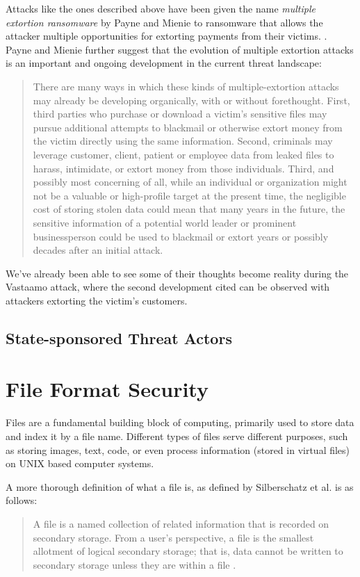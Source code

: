 Attacks like the ones described above have been given the name \emph{multiple extortion ransomware} by Payne and
Mienie to ransomware that allows the attacker multiple opportunities for extorting payments from their victims.
\cite{multiple-extortion-ransomware}.
Payne and Mienie further suggest that the evolution of multiple extortion attacks is an important and ongoing
development in the current threat landscape:
\begin{quote}
  There are many ways in which these kinds of multiple-extortion attacks may already be developing organically,
  with or without forethought. First, third parties who purchase or download a victim's sensitive files may pursue
  additional attempts to blackmail or otherwise extort money from the victim directly using the same information.
  Second, criminals may leverage customer, client, patient or employee data from leaked files to harass,
  intimidate, or extort money from those individuals. Third, and possibly most concerning of all, while an individual
  or organization might not be a valuable or high-profile target at the present time, the negligible cost of storing
  stolen data could mean that many years in the future, the sensitive information of a potential world leader or
  prominent businessperson could be used to blackmail or extort years or possibly decades after an initial attack.
  \cite{multiple-extortion-ransomware} %
\end{quote}
We've already been able to see some of their thoughts become reality during the Vastaamo attack, where the second
development cited can be observed with attackers extorting the victim's customers.

\subsection{State-sponsored Threat Actors}

\section{File Format Security}
Files are a fundamental building block of computing, primarily used to store data and index it by a file name.
Different types of files serve different purposes, such as storing images, text, code, or even process 
information (stored in virtual files) on UNIX based computer systems.

A more thorough definition of what a file is, as defined by Silberschatz et al. is as follows:
\begin{quote}
  A file is a named collection of related information that is recorded on secondary storage. From a user's perspective, 
  a file is the smallest allotment of logical secondary storage; that is, data cannot be written to secondary storage 
  unless they are within a file \cite[p.~422]{operating-system-concepts}.
\end{quote}

